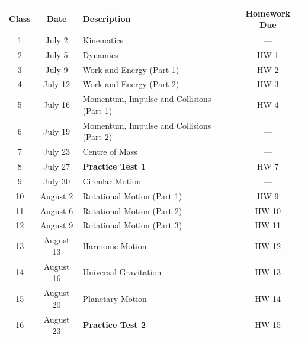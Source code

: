 \documentclass{../../../oss-handout}
\begin{document}
\bgroup
\def\arraystretch{1.1}
\begin{center}
  \begin{tabular}{|c|c|p{4in}|c|}
    \hline
    \rowcolor{lightgray}
    \textbf{Class} & \textbf{Date} & \textbf{Description} &
    \textbf{Homework Due} \\
    \hline\hline
    1  & July 2    & Kinematics & --- \\ \hline
    2  & July 5    & Dynamics   & HW 1\\ \hline
    3  & July 9    & Work and Energy (Part 1) & HW 2 \\ \hline
    4  & July 12   & Work and Energy (Part 2) & HW 3 \\ \hline
    5  & July 16   & Momentum, Impulse and Collisions (Part 1) & HW 4 \\ \hline
    6  & July 19   & Momentum, Impulse and Collisions (Part 2) & --- \\ \hline
    7  & July 23   & Centre of Mass & --- \\ \hline
    \rowcolor{lightgray!50}
    8  & July 27   & \textbf{Practice Test 1} & HW 7    \\ \hline
    9  & July 30  & Circular Motion             & ---   \\ \hline
    10 & August 2  & Rotational Motion (Part 1) & HW 9  \\ \hline
    11 & August 6  & Rotational Motion (Part 2) & HW 10 \\ \hline
    12 & August 9  & Rotational Motion (Part 3) & HW 11 \\ \hline
    13 & August 13 & Harmonic Motion            & HW 12 \\ \hline
    14 & August 16 & Universal Gravitation      & HW 13 \\ \hline
    15 & August 20 & Planetary Motion           & HW 14 \\ \hline
    \rowcolor{lightgray!50}
    16 & August 23 & \textbf{Practice Test 2}   & HW 15 \\ \hline
  \end{tabular}
\end{center}
\egroup
\end{document}
